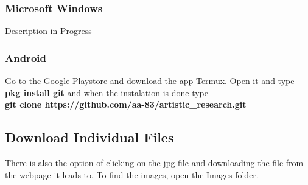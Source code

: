 \documentclass[12pt, letterpaper]{article}
\begin{document}
\subsubsection{Microsoft Windows}
Description in Progress

\subsubsection{Android}
Go to the Google Playstore and download the app Termux. Open it and type \textbf{pkg
install git} and when the instalation is done type \hfill \\
\textbf{git clone https://github.com/aa-83/artistic\_research.git}

\subsection{Download Individual Files}
There is also the option of clicking on the jpg-file and downloading the file
from the webpage it leads to. To find the images, open the Images folder.
\end{document}
